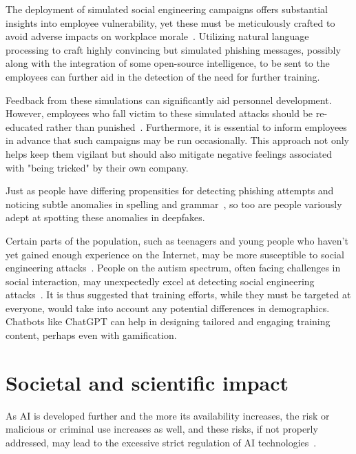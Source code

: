 The deployment of simulated social engineering campaigns offers substantial insights into employee vulnerability, yet these must be meticulously crafted to avoid adverse impacts on workplace morale~\citep{mitnick_The_Art_of_Deception_2003}. Utilizing natural language processing to craft highly convincing but simulated phishing messages, possibly along with the integration of some open-source intelligence, to be sent to the employees can further aid in the detection of the need for further training.

Feedback from these simulations can significantly aid personnel development. However, employees who fall victim to these simulated attacks should be re-educated rather than punished~\citep{mitnick_The_Art_of_Deception_2003}. Furthermore, it is essential to inform employees in advance that such campaigns may be run occasionally. This approach not only helps keep them vigilant but should also mitigate negative feelings associated with "being tricked" by their own company.

Just as people have differing propensities for detecting phishing attempts and noticing subtle anomalies in spelling and grammar~\citep{nicholson_Investigating_Teenagers_Detect_Phishing_2020, neupane_Social_Disorders_Facilitate_SE_2018}, so too are people variously adept at spotting these anomalies in deepfakes.

%
%
Certain parts of the population, such as teenagers and young people who haven't yet gained enough experience on the Internet, may be more susceptible to social engineering attacks~\citep{nicholson_Investigating_Teenagers_Detect_Phishing_2020}. People on the autism spectrum, often facing challenges in social interaction, may unexpectedly excel at detecting social engineering attacks~\citep{neupane_Social_Disorders_Facilitate_SE_2018}. It is thus suggested that training efforts, while they must be targeted at everyone, would take into account any potential differences in demographics. Chatbots like ChatGPT can help in designing tailored and engaging training content, perhaps even with gamification.





\section{Societal and scientific impact}
\begin{comment}
\end{comment}
As AI is developed further and the more its availability increases, the risk or malicious or criminal use increases as well, and these risks, if not properly addressed, may lead to the excessive strict regulation of AI technologies~\citep{king_AI_Crime_Interdisciplinary_Analysis_2019}.


